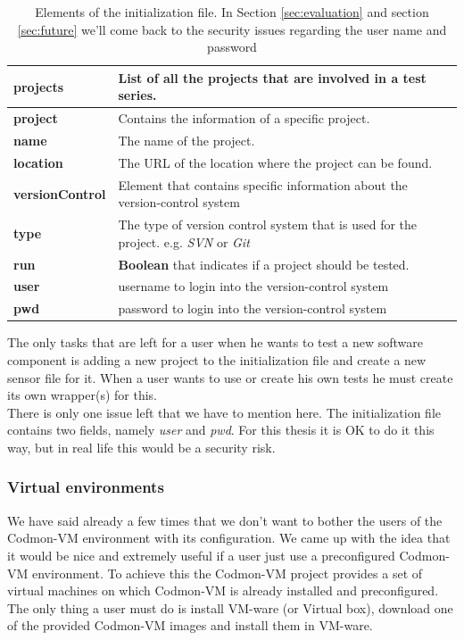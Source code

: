 \documentclass{article}
\newcommand{\project}{Codmon-VM}
\begin{document}
\begin{table}[ht]
\centering
  \begin{tabular}{ | l| p{5cm} |}
  \hline
  \textbf{projects} & List of all the projects that are involved in a test series. \\ \hline
  \textbf{project} & Contains the information of a specific project. \\ \hline
  \textbf{name} & The name of the project. \\ \hline
  \textbf{location} & The URL of the location where the project can be found. \\ \hline
  \textbf{versionControl} & Element that contains specific information about the version-control system \\ \hline
  \textbf{type} & The type of version control system that is used for the project. e.g. \emph{SVN} or \emph{Git} \\ \hline
  \textbf{run} & \textbf{Boolean} that indicates if a project should be tested. \\ \hline
  \textbf{user} & username to login into the version-control system \\ \hline
  \textbf{pwd} & password to login into the version-control system \\ \hline
  \end{tabular}
\caption{Elements of the initialization file. In Section \ref{sec:evaluation} and section \ref{sec:future} we'll come back to the security issues regarding the user name and password}
\label{tab:init}
\end{table}


\noindent The only tasks that are left for a user  when he wants to test a new software component is adding a new project to the initialization file and create a new sensor file for it. When a user wants 
to use or create his own tests he must create its own wrapper(s) for this.\\ 

\noindent There is only one issue left that we have to mention here. The initialization file contains two fields, namely \emph{user} and \emph{pwd}. For this thesis it is OK to do it this way, but in real life 
this would be a security risk. 

\subsubsection{Virtual environments}
\label{imp:virual}
We have said already a few times that we don't want to bother the users of the \project{} environment with its configuration. We came up with the idea that it would be nice and extremely useful if a 
user just use a preconfigured \project{} environment. To achieve this the \project{} project provides a set of virtual machines on which \project{} is already installed and preconfigured. The only thing a 
user must do is install VM-ware (or Virtual box), download one of the provided \project{} images and install them in VM-ware.\\
\end{document}
